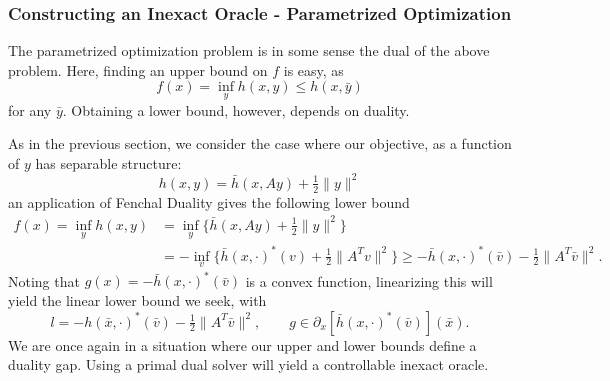 \subsubsection{Constructing an Inexact Oracle - Parametrized Optimization} 
The parametrized optimization problem is in some sense the dual of the above problem. Here, finding an upper bound on $f$ is easy, as
\[
  f(x)=\inf_{y}h(x,y) \leq h(x,\bar{y})
\]
for any $\bar{y}$. Obtaining a lower bound, however, depends on duality. 

As in the previous section, we consider the case where our objective, as a function
of $y$ has separable structure:
\[
h(x,y) = \bar{h}(x,Ay)+\tfrac{1}{2}\|y\|^2
\]
an application of Fenchal Duality gives the following lower bound
\begin{align*}
f(x)=\inf_{y}h(x,y) & =\inf_{y}\big\{\bar{h}(x,Ay)+\tfrac{1}{2}\|y\|^{2}\big\}\\
 & =-\inf_{v}\big\{\bar{h}(x,\cdot)^{*}(v)+\tfrac{1}{2}\|A^{T}v\|^{2}\big\}\geq-\bar{h}(x,\cdot)^{*}(\bar{v})-\tfrac{1}{2}\|A^{T}\bar{v}\|^{2}.
\end{align*}
Noting that $g(x)=-\bar{h}(x,\cdot)^{*}(\bar{v})$ is a convex function, linearizing this will yield the linear lower bound we seek, with
\[
l=-h(\bar{x},\cdot)^{*}(\bar{v})-\tfrac{1}{2}\|A^{T}\bar{v}\|^{2},\qquad g\in\partial_{x}[\bar{h}(x,\cdot)^{*}(\bar{v})](\bar{x}).
\]
We are once again in a situation where our upper and lower bounds define a duality gap. Using a primal dual solver will yield a controllable inexact oracle.


